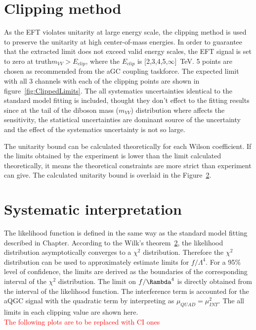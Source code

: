 \section{Clipping method}
\label{subsec:clipping}
As the EFT violates unitarity at large energy scale, the clipping method is used to preserve the unitarity at high center-of-mass energies. In order to guarantee that the extracted limit does not exceed valid energy scales, the EFT signal is set to zero at truth$m_{VV} > E_{clip}$, where the $E_{clip}$ is [2,3,4,5,$\infty$]~TeV. 5 points are chosen as recommended from the aGC coupling taskforce.\cite{ATL-COM-PHYS-2017-433} 
The expected limit with all 3 channels with each of the clipping points are shown in figure~\ref{fig:ClippedLimits}. 
The all systematics uncertainties identical to the standard model fitting is included, thought they don't effect to the fitting results since at the tail of the diboson mass ($m_{VV}$) distribution where affects the sensitivity, the statistical uncertainties are dominant source of the uncertainty and the effect of the systematics uncertainty is not so large.

The unitarity bound can be calculated theoretically for each Wilson coefficient.
If the limits obtained by the experiment is lower than the limit calculated theoretically, it means the theoretical constraints are more strict than experiment can give. The calculated unitarity bound is overlaid in the Figure~\ref{}.

\section{Systematic interpretation}
The likelihood function is defined in the same way as the standard model fitting described in Chapter{}. According to the Wilk's theorem~\ref{}, the likelihood distribution asymptotically converges to a $\chi^2$ distribution. 
Therefore the $\chi^2$ distribution can be used to approximately estimate limits for $f/\Lambda^4$. For a 95\% level of confidence, the limits are derived as the boundaries of the corresponding interval of the $\chi^2$ distribution.
The limit on $f/\Rambda^4$ is directly obtained from the interval of the likelihood function. The interference term is accounted for the aQGC signal with the quadratic term by interpreting as $\mu_{QUAD} = \mu_{INT}^2$. 
The all limits in each clipping value are shown here. \\
\textcolor{red}{The following plots are to be replaced with CI ones}

